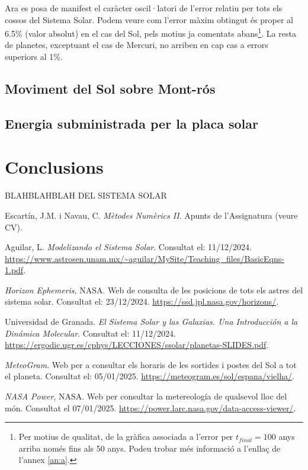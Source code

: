 \documentclass[10pt, twoside, a4paper]{article}
\begin{document}
Ara es posa de manifest el caràcter oscil·latori de l'error relatiu per tots els cossos del Sistema Solar. Podem veure com l'error màxim obtingut és proper al 6.5\% (valor absolut) en el cas del Sol, pels motius ja comentats abans\footnote{Per motius de qualitat, de la gràfica associada a l'error per $t_{final}=100$ anys arriba només fins als 50 anys. Podeu trobar més informació a l'enllaç de l'annex \ref{an:a}.}. La resta de planetes, exceptuant el cas de Mercuri, no arriben en cap cas a errors superiors al 1\%.




\subsection{Moviment del Sol sobre Mont-rós}


\subsection{Energia subministrada per la placa solar}


\section{Conclusions}

BLAHBLAHBLAH DEL SISTEMA SOLAR

\newpage
\begin{thebibliography}{99}
    Escartín, J.M. i Navau, C. \textit{Mètodes Numèrics II}. Apunts de l'Assignatura (veure CV).

    Aguilar, L. \textit{Modelizando el Sistema Solar}. Consultat el: 11/12/2024. \url{https://www.astrosen.unam.mx/~aguilar/MySite/Teaching_files/BasicEqns-1.pdf}.

    \textit{Horizon Ephemeris}, NASA. Web de consulta de les posicions de tots els astres del sistema solar. Consultat el: 23/12/2024. \url{https://ssd.jpl.nasa.gov/horizons/}.

    Universidad de Granada. \textit{El Sistema Solar y las Galaxias. Una Introducción a la Dinámica Molecular}. Consultat el: 11/12/2024. \url{https://ergodic.ugr.es/cphys/LECCIONES/ssolar/planetas-SLIDES.pdf}.

    \textit{MeteoGram}. Web per a consultar els horaris de les sortides i postes del Sol a tot el planeta. Consultat el: 05/01/2025. \url{https://meteogram.es/sol/espana/vielha/}.

    \textit{NASA Power}, NASA. Web per consultar la metereología de qualsevol lloc del món. Consultat el 07/01/2025. \url{https://power.larc.nasa.gov/data-access-viewer/}.

    
\end{thebibliography}
\end{document}
